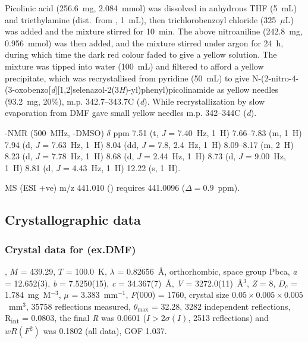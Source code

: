 \begin{refsection}
    Picolinic acid (256.6~mg, 2.084~mmol) was dissolved in anhydrous THF (5~mL) and triethylamine (dist.\ from , 1~mL), then trichlorobenzoyl chloride (325~$\mu$L) was added and the mixture stirred for 10~min.
    The above nitroaniline  (242.8~mg, 0.956~mmol) was then added, and the mixture stirred under argon for 24~h, during which time the dark red colour faded to give a yellow solution.
    The mixture was tipped into water (100~mL) and filtered to afford a yellow precipitate, which was recrystallised from pyridine (50~mL) to give  N-(2-nitro-4-(3-oxobenzo[\emph{d}][1,2]selenazol-2(3\emph{H})-yl)phenyl)picolinamide  as yellow needles (93.2~mg, 20\%), m.p. 342.7--343.7\degree{}C (\emph{d}).
    While recrystallization by slow evaporation from DMF gave small yellow needles m.p. 342--344\degree{}C (\emph{d}).
    
    -NMR (500~MHz, -DMSO) $\delta$ ppm
    7.51 (t, \emph{J} = 7.40~Hz, 1~H) 7.66--7.83 (m, 1~H) 7.94 (d, \emph{J} = 7.63~Hz, 1~H) 8.04 (dd, \emph{J} = 7.8, 2.4~Hz, 1~H) 8.09--8.17 (m, 2~H) 8.23 (d, \emph{J} = 7.78~Hz, 1~H) 8.68 (d, \emph{J} = 2.44~Hz, 1~H) 8.73 (d, \emph{J} = 9.00~Hz, 1~H) 8.81 (d, \emph{J} = 4.43~Hz, 1~H) 12.22 (s, 1~H).
    
    MS (ESI +ve) m/z 441.010 ()  requires 441.0096 ($\Delta=0.9$~ppm).
    
    
    \subsection{Crystallographic data}
    
    \subsubsection{Crystal data for \texorpdfstring{(ex.DMF)}{C19H12N4O4Se}}
    , $M$ = 439.29, $T$ = 100.0~K, $\lambda$ = 0.82656~\AA, orthorhombic, space group Pbca, \emph{a} = 12.652(3), \emph{b} = 7.5250(15), \emph{c} = 34.367(7)~\AA, \emph{V} = 3272.0(11)~\AA$^3$, \emph{Z} = 8, $D_c$ = 1.784~mg~M$^{-3}$, $\mu$ = 3.383~mm$^{-1}$, \emph{F}(000) = 1760, crystal size $0.05 \times 0.005 \times 0.005$~mm$^3$, 35758 reflections measured, $\theta_{\max}$ = 32.28\degree{}, 3282 independent reflections, R\textsubscript{int} = 0.0803, the final \emph{R} was 0.0601 ($I > 2\sigma(I)$, 2513 reflections) and $wR(F^2)$ was 0.1802 (all data), GOF 1.037.
    

\end{refsection}
